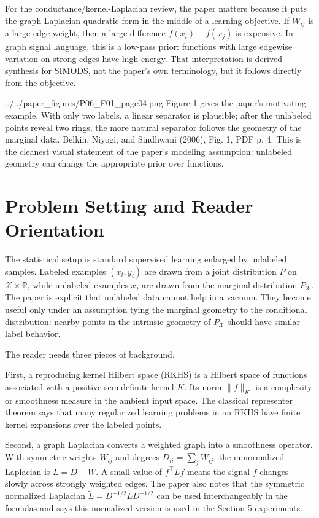 \documentclass[11pt]{article}
\begin{document}
For the conductance/kernel-Laplacian review, the paper matters because it
puts the graph Laplacian quadratic form in the middle of a learning objective.
If $W_{ij}$ is a large edge weight, then a large difference
$f(x_i)-f(x_j)$ is expensive.  In graph signal language, this is a low-pass
prior: functions with large edgewise variation on strong edges have high
energy.  That interpretation is derived synthesis for SIMODS, not the paper's
own terminology, but it follows directly from the objective.

\paperfigure
  {../../paper_figures/P06_F01_page04.png}
  {Figure 1 gives the paper's motivating example.  With only two labels, a
  linear separator is plausible; after the unlabeled points reveal two rings,
  the more natural separator follows the geometry of the marginal data.}
  {Belkin, Niyogi, and Sindhwani (2006), Fig. 1, PDF p. 4.}
  {This is the cleanest visual statement of the paper's modeling assumption:
  unlabeled geometry can change the appropriate prior over functions.}

\section{Problem Setting and Reader Orientation}

The statistical setup is standard supervised learning enlarged by unlabeled
samples.  Labeled examples $(x_i,y_i)$ are drawn from a joint distribution
$P$ on $\mathcal{X}\times\mathbb{R}$, while unlabeled examples $x_j$ are drawn
from the marginal distribution $P_{\mathcal{X}}$.  The paper is explicit that
unlabeled data cannot help in a vacuum.  They become useful only under an
assumption tying the marginal geometry to the conditional distribution:
nearby points in the intrinsic geometry of $P_{\mathcal{X}}$ should have
similar label behavior.

The reader needs three pieces of background.

First, a reproducing kernel Hilbert space (RKHS) is a Hilbert space of
functions associated with a positive semidefinite kernel $K$.  Its norm
$\|f\|_K$ is a complexity or smoothness measure in the ambient input space.
The classical representer theorem says that many regularized learning
problems in an RKHS have finite kernel expansions over the labeled points.

Second, a graph Laplacian converts a weighted graph into a smoothness
operator.  With symmetric weights $W_{ij}$ and degrees
$D_{ii}=\sum_j W_{ij}$, the unnormalized Laplacian is $L=D-W$.  A small value
of $f^\top L f$ means the signal $f$ changes slowly across strongly weighted
edges.  The paper also notes that the symmetric normalized Laplacian
$\widetilde{L}=D^{-1/2}LD^{-1/2}$ can be used interchangeably in the formulas
and says this normalized version is used in the Section 5 experiments.
\end{document}
